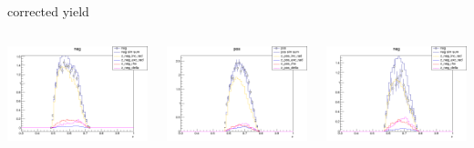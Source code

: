 \begin{frame}{corrected yield}
\begin{columns}
\begin{column}[T]{0.25\textwidth}
\includegraphics[width = \textwidth]{results/yield/statistics_corr/yield_x_Q2_z_0.65_5.500_0.60_neg.png}
\end{column}
\begin{column}[T]{0.25\textwidth}
\includegraphics[width = \textwidth]{results/yield/statistics_corr/yield_x_Q2_z_0.65_5.500_0.70_pos.png}
\end{column}
\begin{column}[T]{0.25\textwidth}
\includegraphics[width = \textwidth]{results/yield/statistics_corr/yield_x_Q2_z_0.65_5.500_0.70_neg.png}
\end{column}
\end{columns}
\end{frame}
